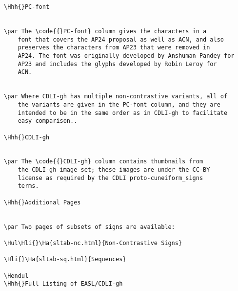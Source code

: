 \begin{verbatim}
\Hhh{}PC-font


\par The \code{{}PC-font} column gives the characters in a
	font that covers the AP24 proposal as well as ACN, and also
	preserves the characters from AP23 that were removed in
	AP24. The font was originally developed by Anshuman Pandey for
	AP23 and includes the glyphs developed by Robin Leroy for
	ACN.


\par Where CDLI-gh has multiple non-contrastive variants, all of
	the variants are given in the PC-font column, and they are
	intended to be in the same order as in CDLI-gh to facilitate
	easy comparison..

\Hhh{}CDLI-gh


\par The \code{{}CDLI-gh} column contains thumbnails from
	the CDLI-gh image set; these images are under the CC-BY
	license as required by the CDLI proto-cuneiform_signs
	terms.

\Hhh{}Additional Pages


\par Two pages of subsets of signs are available:

\Hul\Hli{}\Ha{sltab-nc.html}{Non-Contrastive Signs}

\Hli{}\Ha{sltab-sq.html}{Sequences}

\Hendul
\Hhh{}Full Listing of EASL/CDLI-gh


\end{verbatim}
